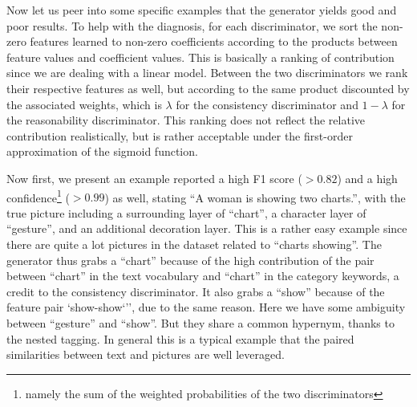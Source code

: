\documentclass{article} %
\begin{document}
Now let us peer into some specific examples that the generator yields good and poor results. To help with the diagnosis, for each discriminator, we sort the non-zero features learned to non-zero coefficients according to the products between feature values and coefficient values. This is basically a ranking of contribution since we are dealing with a linear model. Between the two discriminators we rank their respective features as well, but according to the same product discounted by the associated weights, which is $\lambda$ for the consistency discriminator and $1-\lambda$ for the reasonability discriminator. This ranking does not reflect the relative contribution realistically, but is rather acceptable under the first-order approximation of the sigmoid function.

Now first, we present an example reported a high F1 score ($>0.82$) and a high confidence\footnote{namely the sum of the weighted probabilities of the two discriminators} ($>0.99$) as well, stating ``A woman is showing two charts.'', with the true picture including a surrounding layer of ``chart'', a character layer of ``gesture'', and an additional decoration layer. This is a rather easy example since there are quite a lot pictures in the dataset related to ``charts showing''. The generator thus grabs a ``chart'' because of the high contribution of the pair  between ``chart'' in the text vocabulary and ``chart'' in the category keywords, a credit to the consistency discriminator. It also grabs a ``show'' because of the feature pair `show-show`'', due to the same reason. Here we have some ambiguity between ``gesture'' and ``show''. But they share a common hypernym, thanks to the nested tagging. In general this is a typical example that the paired similarities between text and pictures are well leveraged.
\end{document}
